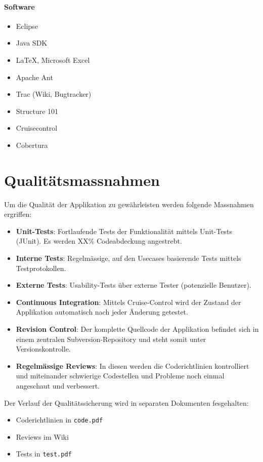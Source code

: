 \documentclass[12pt,halfparskip]{scrartcl}
\begin{document}
\paragraph{Software}
\begin{itemize}
	\item Eclipse
	\item Java SDK
	\item \LaTeX{}, Microsoft Excel
	\item Apache Ant
	\item Trac (Wiki, Bugtracker)
	\item Structure 101
	\item Cruisecontrol
	\item Cobertura
\end{itemize}


\section{Qualitätsmassnahmen}

Um die Qualität der Applikation zu gewährleisten werden folgende Massnahmen ergriffen:
\begin{itemize}
	\item \textbf{Unit-Tests}: Fortlaufende Tests der Funktionalität mittels Unit-Tests (JUnit). Es werden XX\% Codeabdeckung angestrebt.
	\item \textbf{Interne Tests}: Regelmässige, auf den Usecases basierende Tests mittels Testprotokollen.
	\item \textbf{Externe Tests}: Usability-Tests über externe Tester (potenzielle Benutzer).
	\item \textbf{Continuous Integration}: Mittels Cruise-Control wird der Zustand der Applikation automatisch nach jeder Änderung getestet.
	\item \textbf{Revision Control}: Der komplette Quellcode der Applikation befindet sich in einem zentralen Subversion-Repository und steht somit unter Versionskontrolle.
	\item \textbf{Regelmässige Reviews}: In diesen werden die Coderichtlinien kontrolliert und miteinander schwierige Codestellen und Probleme noch einmal angeschaut und verbessert.
\end{itemize}

Der Verlauf der Qualitätssicherung wird in separaten Dokumenten fesgehalten:
\begin{itemize}
	\item Coderichtlinien in \texttt{code.pdf}
	\item Reviews im Wiki
	\item Tests in \texttt{test.pdf}
\end{itemize}
\end{document}
